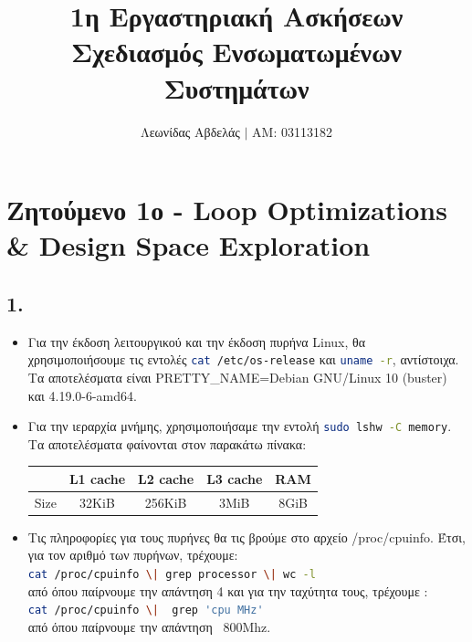 \documentclass{article}
\title{1η Εργαστηριακή Ασκήσεων \\
        Σχεδιασμός Ενσωματωμένων Συστημάτων}
\newcommand{\english}[1]{\foreignlanguage{english}{{#1}}}
\begin{document}
\date{}
\author{Λεωνίδας Αβδελάς $|$ ΑΜ: 03113182}

\maketitle
\newpage

\section*{Ζητούμενο 1ο - \english{Loop Optimizations \\ \& Design Space Exploration}}

\subsection*{1.}
\begin{itemize}
    \item Για την έκδοση λειτουργικού και την έκδοση πυρήνα \english{Linux}, θα χρησιμοποιήσουμε τις εντολές \english{\lstinline[language=bash]{cat /etc/os-release}} και \english{\lstinline[language=bash]{uname -r}}, αντίστοιχα. Τα αποτελέσματα είναι \english{PRETTY\_NAME=Debian GNU/Linux 10 (buster)} και \english{4.19.0-6-amd64}.
    \item Για την ιεραρχία μνήμης, χρησιμοποιήσαμε την εντολή \english{\lstinline[language=bash]{sudo lshw -C memory}}. Τα αποτελέσματα φαίνονται στον παρακάτω πίνακα:\\
    \begin{otherlanguage}{english}
        \begin{center}
            \begin{tabular}{|c|c|c|c|c|}\hline
                & L1 cache & L2 cache & L3 cache & RAM \\ \hline
                Size & 32KiB & 256KiB & 3MiB & 8GiB \\ \hline
           \end{tabular}
        \end{center}
        \end{otherlanguage}
    \item Τις πληροφορίες για τους πυρήνες θα τις βρούμε στο αρχείο \english{/proc/cpuinfo}. Έτσι, για τον αριθμό των πυρήνων, τρέχουμε:
    \\ \english{\lstinline[language=bash]{cat /proc/cpuinfo \| grep processor \| wc -l}} \\
    από όπου παίρνουμε την απάντηση 4 και για την ταχύτητα τους, τρέχουμε :\\
    \english{\lstinline[language=bash]{cat /proc/cpuinfo \|  grep 'cpu MHz'}} \\
    από όπου παίρνουμε την απάντηση \english{~800Mhz}.
\end{itemize}
\end{document}
